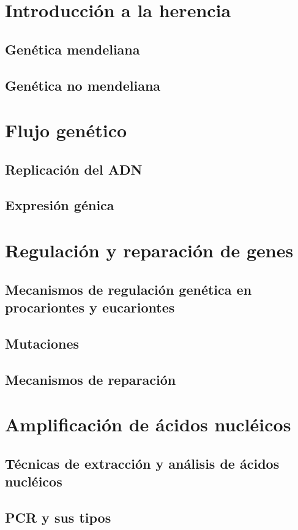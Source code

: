 \documentclass{../summarie}
\begin{document}
\Portada
\Indice
\fancystyle
\onehalfspacing


\part{Introducción a la herencia}

    \chapter{Genética mendeliana}
    \chapter{Genética no mendeliana}

\part{Flujo genético}

    \chapter{Replicación del ADN}
        

    \chapter{Expresión génica}
        

\part{Regulación y reparación de genes}

    \chapter{Mecanismos de regulación genética en procariontes y eucariontes}
        
    
    \chapter{Mutaciones}
    \chapter{Mecanismos de reparación}

\part{Amplificación de ácidos nucléicos}

    \chapter{Técnicas de extracción y análisis de ácidos nucléicos}
    \chapter{PCR y sus tipos}
        


\newpage


\end{document}
